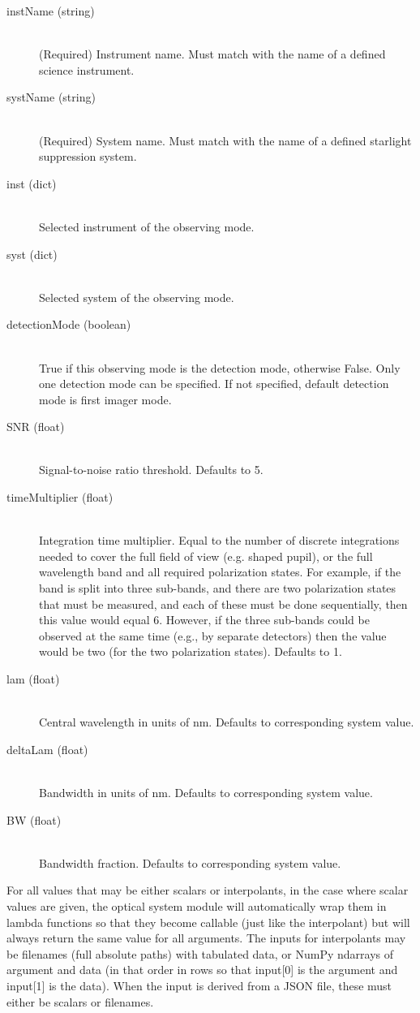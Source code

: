 \documentclass[cleanfoot]{asme2ej}
\begin{document}
\begin{itemize}
\begin{description}
    \begin{description}
        \item[instName (string)]\hfill \\ (Required) Instrument name. Must match with the name of a defined science instrument.
        \item[systName (string)]\hfill \\ (Required) System name. Must match with the name of a defined starlight suppression system.
        \item[inst (dict)]\hfill \\ Selected instrument of the observing mode.
        \item[syst (dict)]\hfill \\ Selected system of the observing mode.
        \item[detectionMode (boolean)]\hfill \\ True if this observing mode is the detection mode, otherwise False. Only one detection mode can be specified. If not specified, default detection mode is first imager mode.
        \item[SNR (float)]\hfill \\ Signal-to-noise ratio threshold. Defaults to 5.
        \item[timeMultiplier (float)]\hfill \\ Integration time multiplier. Equal to the number of discrete integrations needed to cover the full field of view (e.g. shaped pupil), or the full wavelength band and all required polarization states.  For example, if the band is split into three sub-bands, and there are two polarization states that must be measured, and each of these must be done sequentially, then this value would equal 6.  However, if the three sub-bands could be observed at the same time (e.g., by separate detectors) then the value would be two (for the two polarization states). Defaults to 1.
        \item[lam (float)]\hfill \\ Central wavelength in units of nm. Defaults to corresponding system value.
        \item[deltaLam (float)]\hfill \\ Bandwidth in units of nm. Defaults to corresponding system value.
        \item[BW (float)]\hfill \\ Bandwidth fraction. Defaults to corresponding system value.
    \end{description}
\end{description}
\end{itemize}
For all values that may be either scalars or interpolants, in the case where scalar values are given, the optical system module will automatically wrap them in lambda functions so that they become callable (just like the interpolant) but will always return the same value for all arguments.  The inputs for interpolants may be filenames (full absolute paths) with tabulated data, or NumPy ndarrays of argument and data (in that order in rows so that input[0] is the argument and input[1] is the data).  When the input is derived from a JSON file, these must either be scalars or filenames.
\end{document}
